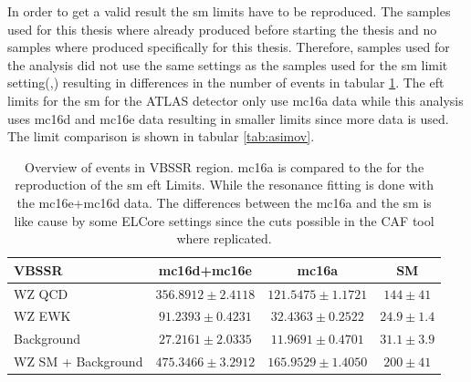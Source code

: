 \documentclass[../Bachelorarbeit.tex]{subfiles}
\begin{document}
\pagebreak


In order to get a valid result the \acrshort{sm} limits have to be reproduced. The samples used for this thesis where already produced before starting the thesis and no samples where produced specifically for this thesis.
Therefore, samples used for the analysis did not use the same settings as the samples used for the \acrshort{sm} limit setting(\cite{Aaboud.2019b},\cite{Aaboud.2019}) resulting in differences in the number of events in tabular \ref{tab:SM_re}.
The \acrshort{eft} limits for the \acrshort{sm} for the ATLAS detector only use mc16a data while this analysis uses mc16d and mc16e data resulting in smaller limits since more data is used.
The limit comparison is shown in tabular \ref{tab:asimov}.


\begin{table}[h]
    \centering
    \begin{tabular}{ l c c c }
        \hline
        VBSSR              & mc16d+mc16e           & mc16a                 & SM             \\
        \hline
        WZ QCD             & $356.8912 \pm 2.4118$ & $121.5475 \pm 1.1721$ & $144 \pm 41$   \\
        WZ EWK             & $91.2393 \pm 0.4231$  & $32.4363 \pm 0.2522$  & $24.9 \pm 1.4$ \\
        Background         & $27.2161 \pm 2.0335$  & $11.9691 \pm 0.4701$  & $31.1 \pm 3.9$ \\
        \hline
        WZ SM + Background & $475.3466 \pm 3.2912$ & $165.9529 \pm 1.4050$ & $200 \pm 41$   \\
        \hline
    \end{tabular}
    \caption{Overview of events in VBSSR region. mc16a is compared to the \cite{Sampsonidou.25.11.2021} for the reproduction of the \acrshort{sm} \acrshort{eft} Limits.
        While the resonance fitting is done with the mc16e+mc16d data. The differences between the mc16a and the \acrshort{sm} is like cause by some ELCore settings
        since the cuts possible in the CAF tool where replicated.}
    \label{tab:SM_re}
\end{table}
\end{document}
